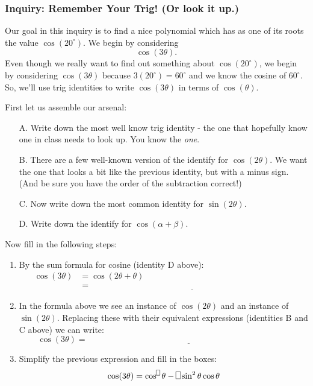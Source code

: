 \documentclass[11pt]{article}
\newenvironment{task}
	{\begin{mdframed}[linecolor=lightgray, linewidth=3pt]\raggedright}
	{\end{mdframed}}
\theoremstyle{definition}
\begin{document}
\subsubsection{Inquiry: Remember Your Trig! (Or look it up.)}
\begin{task}
  Our goal in this inquiry is to find a nice polynomial which has as one of its roots the value $\cos(20^\circ)$. We begin by considering
  \[ \cos(3\theta).\]
  Even though we really want to find out something about $\cos(20^\circ)$, we begin by considering $\cos(3\theta)$ because $3(20^\circ)=60^\circ$ and we
  know the cosine of $60^\circ$. So, we'll use trig identities to write $\cos(3\theta)$ in terms of $\cos(\theta)$.

  First let us assemble our arsenal:
      \begin{enumerate}
        \item[A.] Write down the most well know trig identity - the one that hopefully know one in class needs to look up. You know the \textit{one}.
        \item[B.] There are a few well-known version of the identify for $\cos(2\theta)$. We want the one that looks a bit like the previous identity, but
          with a minus sign. (And be sure you have the order of the subtraction correct!)
        \item[C.] Now write down the most common identity for $\sin(2\theta)$.
        \item[D.] Write down the identify for $\cos(\alpha + \beta)$.
      \end{enumerate}
  Now fill in the following steps:
  \begin{enumerate}
    \item By the sum formula for cosine (identity D above):
      \begin{align*}
       \cos(3\theta) &= \cos(2\theta + \theta)\\
                     &=\underline{\hspace{4in}}
      \end{align*}
    \item In the formula above we see an instance of $\cos(2\theta)$ and an instance of $\sin(2\theta)$. Replacing these with their equivalent
      expressions (identities B and C above) we can write:
      \[ \cos(3\theta) =\underline{\hspace{4in}} \]
    \item Simplify the previous expression and fill in the boxes:
      \[ \cos(3\theta) = \cos^{\framebox(4,6){}}\theta - \framebox(5,8){}\sin^2\theta\cos\theta\]

\end{enumerate}
\end{task}
\end{document}
